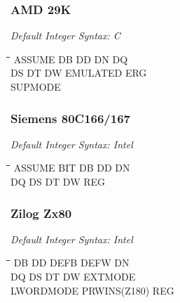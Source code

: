 \subsubsection{AMD 29K}

{\em Default Integer Syntax: C}

{\tt\begin{tabbing}
\hspace{3cm}\=\hspace{3cm}\=\hspace{3cm}\=\hspace{3cm}\=\kill
ASSUME     \> DB          \> DD          \> DN          \> DQ \\
DS         \> DT          \> DW          \> EMULATED    \> ERG \\
SUPMODE \\
\end{tabbing}}

\subsubsection{Siemens 80C166/167}

{\em Default Integer Syntax: Intel}

{\tt\begin{tabbing}
\hspace{3cm}\=\hspace{3cm}\=\hspace{3cm}\=\hspace{3cm}\=\kill
ASSUME     \> BIT         \> DB          \> DD          \> DN \\
DQ         \> DS          \> DT          \> DW          \> REG \\
\end{tabbing}}

\subsubsection{Zilog Zx80}

{\em Default Integer Syntax: Intel}

{\tt\begin{tabbing}
\hspace{3cm}\=\hspace{3cm}\=\hspace{3cm}\=\hspace{3cm}\=\kill
DB         \> DD          \> DEFB        \> DEFW        \> DN \\
DQ         \> DS          \> DT          \> DW          \> EXTMODE \\
LWORDMODE  \> PRWINS(Z180) \> REG \\
\end{tabbing}}

